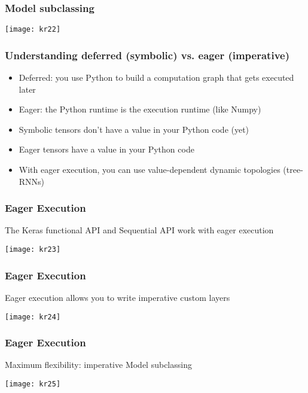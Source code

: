 \begin{frame}[fragile] \frametitle{Model subclassing}
\begin{center}
\texttt{[image: kr22]}
\end{center}
\end{frame}

\begin{frame}[fragile] \frametitle{Understanding deferred (symbolic)
vs. eager (imperative)}

\begin{itemize}
\item  Deferred: you use Python to build a computation graph that gets executed later
\item  Eager: the Python runtime is the execution runtime (like Numpy)
\item Symbolic tensors don’t have a value in your Python code (yet)
\item  Eager tensors have a value in your Python code
\item With eager execution, you can use value-dependent dynamic topologies 
(tree-RNNs)
\end{itemize}
\end{frame}

\begin{frame}[fragile] \frametitle{Eager Execution}

The Keras functional API and Sequential API work with eager execution


\begin{center}
\texttt{[image: kr23]}
\end{center}
\end{frame}


\begin{frame}[fragile] \frametitle{Eager Execution}

Eager execution allows you to write imperative custom layers


\begin{center}
\texttt{[image: kr24]}
\end{center}
\end{frame}

\begin{frame}[fragile] \frametitle{Eager Execution}

Maximum flexibility: imperative Model subclassing

\begin{center}
\texttt{[image: kr25]}
\end{center}
\end{frame}



